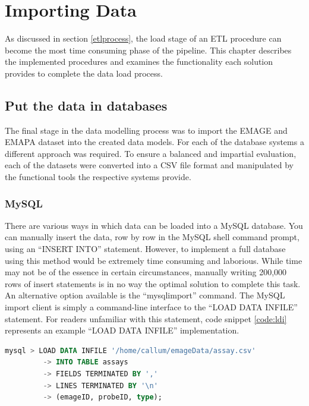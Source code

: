 \chapter{Importing Data}\label{dataload}
As discussed in section \ref{etlprocess}, the load stage of an ETL procedure can become the most time consuming phase of the pipeline. This chapter describes the implemented procedures and examines the functionality each solution provides to complete the data load process.

\section{Put the data in databases}\label{loadsection}
The final stage in the data modelling process was to import the EMAGE and EMAPA dataset into the created data models. For each of the database systems a different approach was required. To ensure a balanced and impartial evaluation, each of the datasets were converted into a CSV file format and manipulated by the functional tools the respective systems provide.

\subsection{MySQL}\label{mysqlload}
There are various ways in which data can be loaded into a MySQL database. You can manually insert the data, row by row in the MySQL shell command prompt, using an ``INSERT INTO'' statement. However, to implement a full database using this method would be extremely time consuming and laborious. While time may not be of the essence in certain circumstances, manually writing 200,000 rows of insert statements is in no way the optimal solution to complete this task. An alternative option available is the ``mysqlimport'' command. The MySQL import client is simply a command-line interface to the ``LOAD DATA INFILE'' statement. For readers unfamiliar with this statement, code snippet \ref{code:ldi} represents an example ``LOAD DATA INFILE'' implementation.
\newpage
\begin{lstlisting}[language=SQL, caption=Example LOAD DATA INFILE statement., label=code:ldi]
mysql > LOAD DATA INFILE '/home/callum/emageData/assay.csv'
	 	 -> INTO TABLE assays
		 -> FIELDS TERMINATED BY ','
		 -> LINES TERMINATED BY '\n'
		 -> (emageID, probeID, type);
\end{lstlisting}


